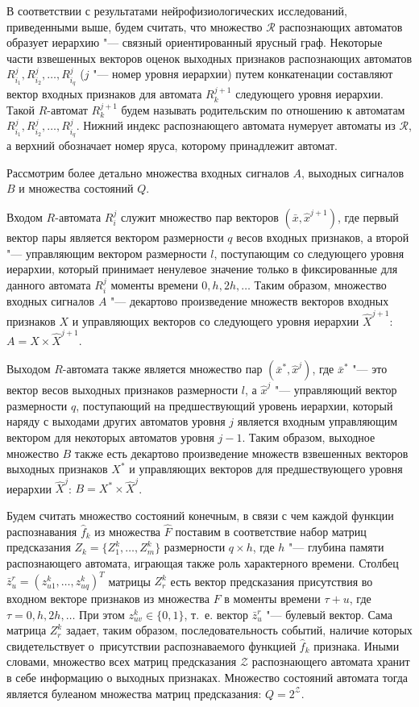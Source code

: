 \documentclass[a4paper, 12pt]{article}
\numberwithin{equation}{section}
\begin{document}
	В соответствии с результатами нейрофизиологических исследований, приведенными выше, будем считать, что множество  $\mathcal R$ распознающих автоматов образует иерархию "--- связный ориентированный ярусный граф. Некоторые части взвешенных векторов оценок выходных признаков распознающих автоматов $R_{i_1}^j,R_{i_2}^j,\dots,R_{i_q}^j$ ($j$ "--- номер уровня иерархии) путем конкатенации составляют вектор входных признаков для  автомата $R_k^{j+1}$ следующего уровня иерархии. Такой $R$-автомат $R_k^{j+1}$ будем называть родительским по отношению к автоматам $R_{i_1}^j,R_{i_2}^j,\dots,R_{i_q}^j$. Нижний индекс распознающего автомата нумерует автоматы из $\mathcal R$, а верхний обозначает номер яруса, которому принадлежит автомат.
		
	Рассмотрим более детально множества входных сигналов $A$, выходных сигналов $B$ и множества состояний $Q$.
	
	Входом $R$-автомата $R_i^j$ служит множество пар векторов $(\bar x,\hat x^{j+1})$, где первый вектор пары является вектором размерности $q$ весов входных признаков, а второй "--- управляющим вектором размерности $l$, поступающим со следующего уровня иерархии, который принимает ненулевое значение только в фиксированные для данного автомата $R_i^j$ моменты времени $0,h,2h,\dots$ Таким образом, множество входных сигналов $A$ "--- декартово произведение множеств векторов входных признаков $X$ и управляющих векторов со следующего уровня иерархии $\hat X^{j+1}$: $A=X\times \hat X^{j+1}$. 
	
	Выходом $R$-автомата также является множество пар $(\bar x^*,\hat x^j)$, где $\bar x^*$ "--- это вектор весов выходных признаков размерности $l$, а $\hat x^j$ "--- управляющий вектор размерности $q$, поступающий на предшествующий уровень иерархии, который наряду с выходами других автоматов уровня $j$ является входным управляющим вектором для некоторых автоматов уровня $j-1$. Таким образом, выходное множество $B$ также есть декартово произведение множеств взвешенных векторов выходных признаков $X^*$ и управляющих векторов для предшествующего уровня иерархии $\hat X^j$: $B=X^*\times \hat X^j$.
	
	Будем считать множество состояний конечным, в связи с чем каждой функции распознавания $\hat f_k$ из множества $\hat F$ поставим в соответствие набор матриц предсказания $Z_k=\{Z_1^k,…,Z_m^k\}$ размерности $q\times h$, где $h$ "--- глубина памяти распознающего автомата, играющая также роль характерного времени. Столбец $\bar{z}_u^r=(z_{u1}^k,…,z_{uq}^k)^T$ матрицы $Z_r^k$ есть вектор предсказания присутствия во входном векторе признаков из множества $F$ в моменты времени $\tau+u$, где $\tau = 0,h,2h,\dots$ При этом $z_{uv}^k\in\{0,1\}$, т.~е. вектор $\bar{z}_u^r$ "--- булевый вектор. Сама матрица $Z_r^k$ задает, таким образом, последовательность событий, наличие которых свидетельствует о~присутствии распознаваемого функцией $\hat f_k$ признака. Иными словами, множество всех матриц предсказания $\mathcal Z$ распознающего автомата хранит в себе информацию о выходных признаках. Множество состояний автомата тогда является булеаном множества матриц предсказания: $Q=2^{\mathcal Z}$.
	
\end{document}
